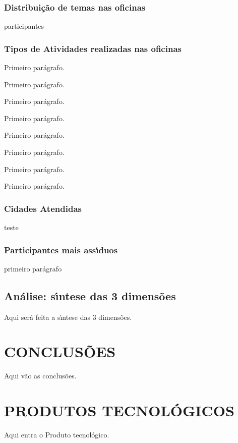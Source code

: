 \documentclass[
12pt,		%
openright,	%
twoside,  %
a4paper,			%
chapter=TITLE,		%
english,			%
french,				%
spanish,			%
brazil				%
]{USPSC-classe/USPSC}
\begin{document}
\subsection[Distribui\c{c}\~ao de temas nas oficinas]{Distribui\c{c}\~ao de temas nas oficinas}\label{Distribui\c{c}\~ao de temas nas oficinas}
participantes


\subsection[Tipos de Atividades realizadas nas oficinas]{Tipos de Atividades realizadas nas oficinas}\label{Tipos de Atividades realizadas nas oficinas}
Primeiro par\'agrafo.


Primeiro par\'agrafo.


Primeiro par\'agrafo.


Primeiro par\'agrafo.


Primeiro par\'agrafo.


Primeiro par\'agrafo.


Primeiro par\'agrafo.


Primeiro par\'agrafo.


\subsection[Cidades Atendidas]{Cidades Atendidas}\label{Cidades Atendidas}
teste


\subsection[Participantes mais ass\'{\i}duos]{Participantes mais ass\'{\i}duos}\label{Participantes mais ass\'{\i}duos}
primeiro par\'agrafo


\section[An\'alise: s\'{\i}ntese das 3 dimens\~oes]{An\'alise: s\'{\i}ntese das 3 dimens\~oes}\label{An\'alise: s\'{\i}ntese das 3 dimens\~oes}
Aqui ser\'a feita a s\'{\i}ntese das 3 dimens\~oes.


\chapter[CONCLUS\~OES]{CONCLUS\~OES}\label{CONCLUS\~OES}
Aqui v\~ao as conclus\~oes.


\chapter[PRODUTOS TECNOL\'OGICOS]{PRODUTOS TECNOL\'OGICOS}\label{PRODUTOS TECNOL\'OGICOS}
Aqui entra o Produto tecnol\'ogico.
\end{document}
